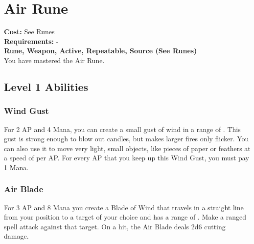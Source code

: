\section{Air Rune}\label{rune:air}
\textbf{Cost:} See Runes\\
\textbf{Requirements:} -\\
\textbf{Rune, Weapon, Active, Repeatable, Source (See Runes)}\\
You have mastered the Air Rune.

\subsection{Level 1 Abilities}

\subsubsection{Wind Gust}
For 2 AP and 4 Mana, you can create a small gust of wind in a range of .
This gust is strong enough to blow out candles, but makes larger fires only flicker.
You can also use it to move very light, small objects, like pieces of paper or feathers at a speed of  per AP.
For every AP that you keep up this Wind Gust, you must pay 1 Mana.

\subsubsection{Air Blade}
For 3 AP and 8 Mana you create a Blade of Wind that travels in a straight line from your position to a target of your choice and has a range of .
Make a ranged spell attack against that target.
On a hit, the Air Blade deals 2d6 cutting damage.